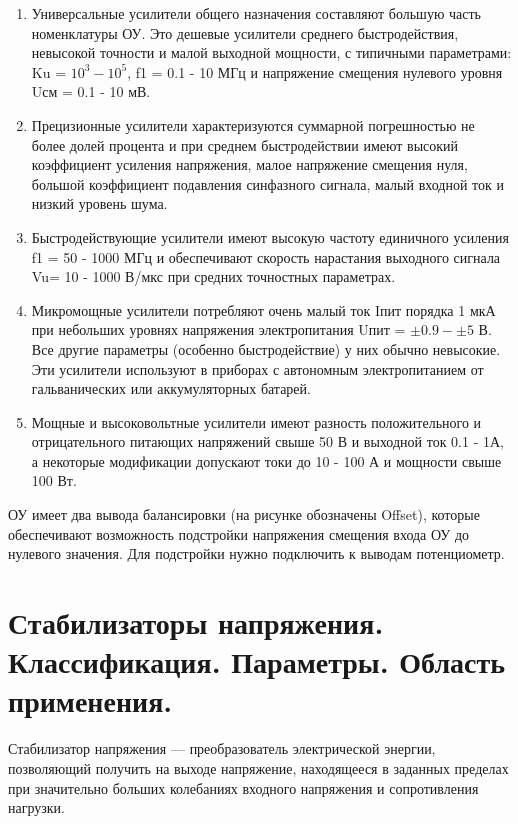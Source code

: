 \documentclass[unicode, 12pt, a4paper, oneside]{article}
\begin{document}
\begin{enumerate}
\item Универсальные усилители общего назначения составляют большую часть номенклатуры ОУ. Это дешевые усилители среднего быстродействия, невысокой точности и малой выходной мощности, с  типичными параметрами: Ku = $10^{3} - 10^{5}$, f1 = 0.1 - 10 МГц и напряжение смещения нулевого уровня Uсм = 0.1 - 10 мВ.

\item Прецизионные усилители характеризуются суммарной погрешностью не более долей процента и при среднем быстродействии имеют высокий коэффициент усиления напряжения, малое напряжение смещения нуля, большой коэффициент подавления синфазного сигнала, малый входной ток и низкий уровень шума.

\item Быстродействующие усилители имеют высокую частоту единичного усиления f1 = 50 - 1000 МГц и обеспечивают скорость нарастания выходного сигнала Vu= 10 - 1000 В/мкс при средних точностных параметрах.

\item Микромощные усилители потребляют очень малый ток Iпит порядка 1 мкА при небольших уровнях напряжения электропитания Uпит = $\pm 0.9 - \pm 5$ В. Все другие параметры (особенно быстродействие) у них обычно невысокие. Эти усилители используют в приборах с автономным электропитанием от гальванических или аккумуляторных батарей.

\item Мощные и высоковольтные усилители имеют разность положительного и отрицательного питающих напряжений свыше 50 В и выходной ток 0.1 - 1А, а некоторые модификации допускают токи до 10 - 100 А и мощности свыше 100 Вт.
\end{enumerate}

ОУ имеет два вывода балансировки (на рисунке обозначены Offset), которые обеспечивают возможность подстройки напряжения смещения входа ОУ до нулевого значения. Для подстройки нужно подключить к выводам потенциометр.


\section{Стабилизаторы напряжения. Классификация. Параметры. Область применения.}

Стабилизатор напряжения — преобразователь электрической энергии, позволяющий получить на выходе напряжение, находящееся в заданных пределах при значительно больших колебаниях входного напряжения и сопротивления нагрузки.
\end{document}
